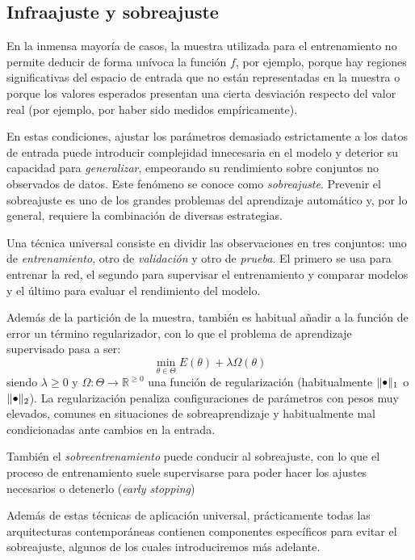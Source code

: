 \subsection{Infraajuste y sobreajuste}
En la inmensa mayoría de casos, la muestra utilizada para el entrenamiento no permite deducir de forma unívoca la función \( f \), por ejemplo, porque hay regiones significativas del espacio de entrada que no están representadas en la muestra o porque los valores esperados presentan una cierta desviación respecto del valor real (por ejemplo, por haber sido medidos empíricamente).

En estas condiciones, ajustar los parámetros demasiado estrictamente a los datos de entrada puede introducir complejidad innecesaria en el modelo y deterior su capacidad para \textit{generalizar}, empeorando su rendimiento sobre conjuntos no observados de datos. Este fenómeno se conoce como \textit{sobreajuste}. Prevenir el sobreajuste es uno de los grandes problemas del aprendizaje automático y, por lo general, requiere la combinación de diversas estrategias.

Una técnica universal consiste en dividir las observaciones en tres conjuntos: uno de \textit{entrenamiento}, otro de \textit{validación} y otro de \textit{prueba}. El primero se usa para entrenar la red, el segundo para supervisar el entrenamiento y comparar modelos y el último para evaluar el rendimiento del modelo.

Además de la partición de la muestra, también es habitual añadir a la función de error un término regularizador, con lo que el problema de aprendizaje supervisado pasa a ser:
\[
    \min_{\theta \in \Theta} E(\theta) + \lambda \Omega(\theta)
\]
siendo \( \lambda \geq 0 \) y \( \Omega \colon \Theta \to \mathbb{R}^{\geq 0} \)  una función de regularización (habitualmente \( \| \smallbullet \|_{1} \) o \( \| \smallbullet \|_{2} \)). La regularización penaliza configuraciones de parámetros con pesos muy elevados, comunes en situaciones de sobreaprendizaje y habitualmente mal condicionadas ante cambios en la entrada.

También el \textit{sobreentrenamiento} puede conducir al sobreajuste, con lo que el proceso de entrenamiento suele supervisarse para poder hacer los ajustes necesarios o detenerlo (\textit{early stopping}) 

Además de estas técnicas de aplicación universal, prácticamente todas las arquitecturas contemporáneas contienen componentes específicos para evitar el sobreajuste, algunos de los cuales introduciremos más adelante.

